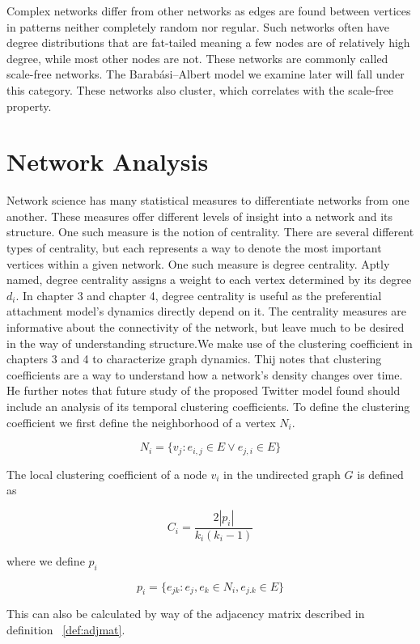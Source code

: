 Complex networks differ from other networks as edges are found between vertices 
in patterns neither completely random nor regular. Such networks often have degree distributions that are fat-tailed
meaning a few nodes are of relatively high degree, while most other nodes are not. These networks
are commonly called scale-free networks. The Barabási–Albert model we examine later will fall under
this category. These networks also cluster, which correlates with the scale-free 
property. 

\section{Network Analysis}
\label{section: Statistical Properties of Networks}
Network science has many statistical measures to differentiate networks from one another. These
measures offer different levels of insight into a network and its structure.
One such measure is the notion of centrality. There are several different types
of centrality, but each represents a way to denote the most important vertices within a 
given network. One such measure is degree centrality. Aptly named, degree centrality 
assigns a weight to each vertex determined by its degree $d_i$. In chapter 3 and chapter 4, degree
centrality is useful as the preferential attachment model's dynamics directly depend on it. The centrality 
measures are informative about the connectivity of the network, but leave much to be desired in the way 
of understanding structure.We make use of the clustering coefficient in chapters 3 and 4 to characterize graph dynamics. Thij \cite{thij}
notes that clustering coefficients are a way to understand how a network's density changes over time. He 
further notes that future study of the proposed Twitter model found should include an analysis of its temporal clustering coefficients.
To define the clustering coefficient we first define the neighborhood of a vertex $N_i$.

$$
N_i = \{v_j: e_{i,j}\in E \lor e_{j,i} \in E\}
$$

\noindent The local clustering coefficient of a node $v_i$ in the undirected graph $G$ is defined as 

$$
C_i = \frac{2|p_i|}{k_i(k_i-1)}
$$

\noindent where we define $p_i$

$$
p_i = \{ e_{jk}: e_j, e_k \in N_i, e_{j.k}\in E\}
$$

\noindent This can also be calculated by way of the adjacency matrix described in definition ~\ref{def:adjmat}.


